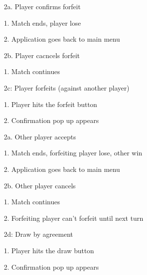 \documentclass[letterpaper,11pt]{article}
\begin{document}
\begin{list}{}{}
\begin{list}{}{}
\begin{list}{}{}
\begin{list}{}{}
							\item 2a. Player confirms forfeit
							\item \begin{list}{}{}
									\item 1. Match ends, player lose
									\item 2. Application goes back to main menu
								\end{list}
							\item 2b. Player cacncels forfeit
							\item \begin{list}{}{}
									\item 1. Match continues
								\end{list}
						\end{list}
				\end{list}
			\item 2c: Player forfeits (against another player)
			\item \begin{list}{}{}
					\item 1. Player hits the forfeit button
					\item 2. Confirmation pop up appears
					\item \begin{list}{}{}
							\item 2a. Other player accepts
							\item \begin{list}{}{}
									\item 1. Match ends, forfeiting player lose, other win
									\item 2. Application goes back to main menu
								\end{list}
							\item 2b. Other player cancels
							\item \begin{list}{}{}
									\item 1. Match continues
									\item 2. Forfeiting player can't forfeit until next turn
								\end{list}
						\end{list}
				\end{list}
			\item 2d: Draw by agreement
			\item \begin{list}{}{}
					\item 1. Player hits the draw button
					\item 2. Confirmation pop up appears

\end{list}
\end{list}
\end{list}
\end{document}
